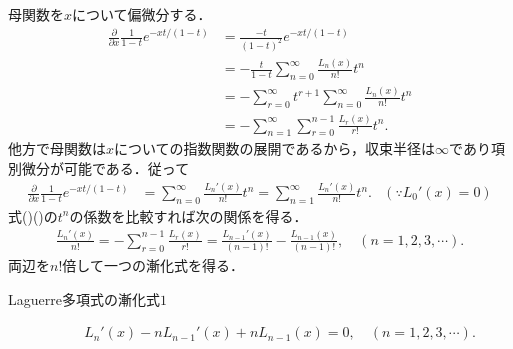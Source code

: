 \documentclass[a4j,papersize,disablejfam,slide,14pt]{jsarticle}
\def\exp#1{e^{#1}} %
\begin{document}
    母関数を$x$について偏微分する．
    \begin{align}
    	\frac{\partial}{\partial x} \frac{1}{1-t} \exp{-xt/(1-t)} &= \frac{-t}{(1-t)^2} \exp{-xt/(1-t)} \\
        	&= -\frac{t}{1-t} \sum_{n=0}^{\infty} \frac{L_n(x)}{n!} t^n \\
            &= -\sum_{r=0}^{\infty} t^{r+1} \sum_{n=0}^{\infty} \frac{L_n(x)}{n!} t^n \\
            &= -\sum_{n=1}^{\infty} \sum_{r=0}^{n-1} \frac{L_r(x)}{r!} t^n. \label{eq:laguerre_x_partial1}
    \end{align}
    他方で母関数は$x$についての指数関数の展開であるから，収束半径は$\infty$であり項別微分が可能である．従って
    \begin{align}
    	\frac{\partial}{\partial x} \frac{1}{1-t} \exp{-xt/(1-t)} &= \sum_{n=0}^{\infty} \frac{L_n'(x)}{n!} t^n 
        = \sum_{n=1}^{\infty} \frac{L_n'(x)}{n!} t^n. & (\because L_0'(x)=0)\label{eq:laguerre_x_partial2}
    \end{align}
    式()()の$t^n$の係数を比較すれば次の関係を得る．
    \begin{align}
    	\frac{L_n'(x)}{n!} = -\sum_{r=0}^{n-1} \frac{L_r(x)}{r!} = \frac{L_{n-1}'(x)}{(n-1)!} - \frac{L_{n-1}(x)}{(n-1)!}, \quad (n=1,2,3,\cdots).
    \end{align}
    両辺を$n!$倍して一つの漸化式を得る．
    \begin{screen}
    	\begin{description}
        \item[{\rm Laguerre}多項式の漸化式$1$]
    		\begin{align}
    			L_n'(x) - n L_{n-1}'(x) + n L_{n-1}(x) = 0, \quad (n=1,2,3,\cdots). \label{eq:laguerre_recurrence1}
    		\end{align}
    	\end{description}
    \end{screen}
    
\end{document}
